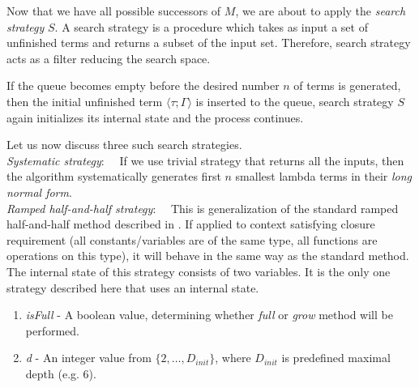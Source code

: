 \documentclass[conference]{IEEEtran}
\newcommand{\Lets}{Let us\xspace}
\newcommand{\setDots}[2]{ \lbrace #1 , \dots , #2 \rbrace}
\newcommand{\ul}[2]{\langle #1 ; #2 \rangle}
\begin{document}
Now that we have all possible successors of $M$, we are about to apply
the \textit{search strategy} $S$. A search strategy is a procedure
which takes as input a set of unfinished terms and returns a subset
of the input set. Therefore, search strategy acts as a filter reducing 
the search space. 

If the queue becomes empty before the desired number $n$ of terms
is generated, then the initial unfinished term $\ul{\tau}{\Gamma}$ 
is inserted to the queue, search strategy $S$
again initializes its internal state and the process continues.

\Lets now discuss three such search strategies.\\

\textit{Systematic strategy}:~~ 
If we use trivial strategy that returns all the inputs, 
then the algorithm systematically generates 
first $n$ smallest lambda terms in their
\textit{long normal form}.\\

\textit{Ramped half-and-half strategy}:~~
This is generalization of the standard ramped half-and-half method described 
in \cite{koza92}. If applied to context satisfying closure requirement
(all constants/variables are of the same type, all functions are operations
on this type), it will behave in the same way as the standard method.
The internal state of this strategy consists of two variables.
It is the only one strategy described here that uses an internal state.

\begin{enumerate}
 \item \textit{isFull} - A boolean value, determining whether \textit{full}
                     or \textit{grow} method will be performed.
 \item \textit{d} - An integer value from $\setDots{2}{D_{init}}$, where 
                $D_{init}$ is predefined maximal depth (e.g. 6).                    
\end{enumerate}
\end{document}
